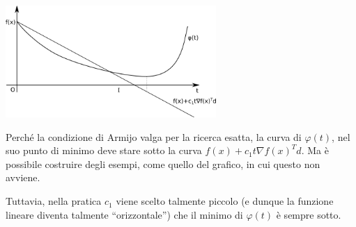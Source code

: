 \centerline{\includegraphics[width=0.60\textwidth]{imgs/ricerca-esatta-no-armijo.png}}

Perch\'e la condizione di Armijo valga per la ricerca esatta, la curva
di $\varphi(t)$, nel suo punto di minimo deve stare sotto la curva
$f(x) + c_1 t \nabla f(x)^{T}d$. Ma \`e possibile costruire degli
esempi, come quello del grafico, in cui questo non avviene.

Tuttavia, nella pratica $c_1$ viene scelto talmente piccolo (e dunque
la funzione lineare diventa talmente ``orizzontale'') che il minimo di
$\varphi(t)$ \`e sempre sotto.

